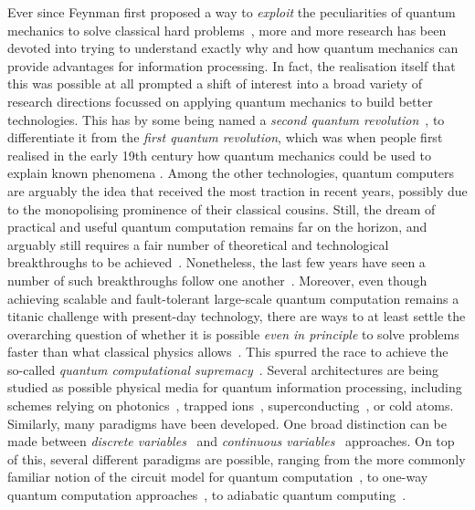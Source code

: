 Ever since Feynman first proposed a way to \emph{exploit} the peculiarities of quantum mechanics to solve classical hard problems~\cite{feynman1982simulating}, more and more research has been devoted into trying to understand exactly why and how quantum mechanics can provide advantages for information processing.
In fact, the realisation itself that this was possible at all prompted a shift of interest into a broad variety of research directions focussed on applying quantum mechanics to build better technologies. This has by some being named a \textit{second quantum revolution}~\cite{dowling2003quantum}, to differentiate it from the \emph{first quantum revolution}, which was when people first realised in the early 19th century how quantum mechanics could be used to explain known phenomena .
Among the other technologies, quantum computers are arguably the idea that received the most traction in recent years, possibly due to the monopolising prominence of their classical cousins.
Still, the dream of practical and useful quantum computation remains far on the horizon, and arguably still requires a fair number of theoretical and technological breakthroughs to be achieved~\cite{preskill2018quantum,flamini2018photonic,wang2019integrated}.
Nonetheless, the last few years have seen a number of such breakthroughs follow one another~\cite{fowler2012surface,barends2014superconducting,córcoles2015demonstration,ofek2016extending,arute2019quantum}.
Moreover, even though achieving scalable and fault-tolerant large-scale quantum computation remains a titanic challenge with present-day technology, there are ways to at least settle the overarching question of whether it is possible \textit{even in principle} to solve problems faster than what classical physics allows~\cite{aaronson2011computational,bremner2016average,boixo2018characterizing,aaronson2017complexity,neill2018blueprint}. This spurred the race to achieve the so-called \textit{quantum computational supremacy}~\cite{broome2012photonic,spring2012boson,crespi2013integrated,tillmann2013experimental,bentivegna2015experimental,zhong201812photon,zhong2019experimental,wang2019boson,bouland2018complexity,arute2019quantum}.
Several architectures are being studied as possible physical media for quantum information processing, including schemes relying on photonics~\cite{wang2019integrated,flamini2018photonic}, trapped ions~\cite{bruzewicz2019trappedion,lekitsch2017blueprint}, superconducting~\cite{krantz2019quantum,you2011atomic}, or cold atoms.
Similarly, many paradigms have been developed. One broad distinction can be made between \textit{discrete variables}~\cite{walmsley2005applied,andersen2015hybrid} and \textit{continuous variables}~\cite{lloyd1999quantum,braunstein2005quantum} approaches.
On top of this, several different paradigms are possible, ranging from the more commonly familiar notion of the circuit model for quantum computation~\cite{nielsen2006quantum}, to one-way quantum computation approaches~\cite{raussendorf2001one,walther2005experimental,browne2006one}, to adiabatic quantum computing~\cite{aharonov2004adiabatic,albash2018adiabatic}.

